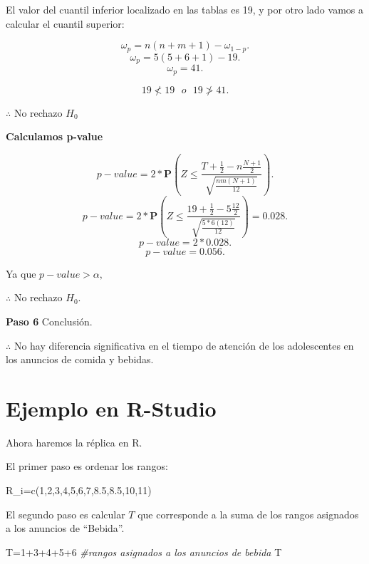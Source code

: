 \documentclass[
  a4paper,
  oneside,
  openany]{book}
\newenvironment{Shaded}{\begin{snugshade}}{\end{snugshade}}
\newcommand{\CommentTok}[1]{\textcolor[rgb]{0.56,0.35,0.01}{\textit{#1}}}
\newcommand{\DecValTok}[1]{\textcolor[rgb]{0.00,0.00,0.81}{#1}}
\newcommand{\FloatTok}[1]{\textcolor[rgb]{0.00,0.00,0.81}{#1}}
\newcommand{\FunctionTok}[1]{\textcolor[rgb]{0.00,0.00,0.00}{#1}}
\newcommand{\NormalTok}[1]{#1}
\newcommand{\OtherTok}[1]{\textcolor[rgb]{0.56,0.35,0.01}{#1}}
\newcommand{\SpecialCharTok}[1]{\textcolor[rgb]{0.00,0.00,0.00}{#1}}
\begin{document}
El valor del cuantil inferior localizado en las tablas es 19, y por otro lado vamos a calcular el cuantil superior:

\[\omega_p= n(n+m+1)-\omega_{1-p}.\]
\[\omega_p= 5(5+6+1)-19.\]
\[\omega_p= 41.\]

\[19 \nless   19  \ \ \  o \ \ \  19 \ngtr 41.\]

\(\therefore\) No rechazo \(H_0\)

\textbf{Calculamos p-value}

\[p-value = 2*\mathbf{P}\left(Z\leq\frac{T+\frac{1}{2}-n\frac{N+1}{2}}{\sqrt{\frac{nm(N+1)}{12}}}\right).\]
\[p-value = 2*\mathbf{P}\left(Z\leq\frac{19+\frac{1}{2}-5\frac{12}{2}}{\sqrt{\frac{5*6(12)}{12}}}\right)=0.028.\]
\[p-value = 2*0.028.\]
\[p-value = 0.056.\]

Ya que \(p-value > \alpha,\)

\(\therefore\) No rechazo \(H_0.\)

\textbf{Paso 6} Conclusión.

\(\therefore\) No hay diferencia significativa en el tiempo de atención de los adolescentes en los anuncios de comida y bebidas.

\hypertarget{ejemplo-en-r-studio-5}{%
\section{Ejemplo en R-Studio}\label{ejemplo-en-r-studio-5}}

Ahora haremos la réplica en R.

El primer paso es ordenar los rangos:

\begin{Shaded}
\begin{Highlighting}[]
\NormalTok{R\_i}\OtherTok{=}\FunctionTok{c}\NormalTok{(}\DecValTok{1}\NormalTok{,}\DecValTok{2}\NormalTok{,}\DecValTok{3}\NormalTok{,}\DecValTok{4}\NormalTok{,}\DecValTok{5}\NormalTok{,}\DecValTok{6}\NormalTok{,}\DecValTok{7}\NormalTok{,}\FloatTok{8.5}\NormalTok{,}\FloatTok{8.5}\NormalTok{,}\DecValTok{10}\NormalTok{,}\DecValTok{11}\NormalTok{)}
\end{Highlighting}
\end{Shaded}

El segundo paso es calcular \(T\) que corresponde a la suma de los rangos asignados a los anuncios de ``Bebida''.

\begin{Shaded}
\begin{Highlighting}[]
\NormalTok{T}\OtherTok{=}\DecValTok{1}\SpecialCharTok{+}\DecValTok{3}\SpecialCharTok{+}\DecValTok{4}\SpecialCharTok{+}\DecValTok{5}\SpecialCharTok{+}\DecValTok{6}  \CommentTok{\#rangos asignados a los anuncios de bebida}
\NormalTok{T}
\end{Highlighting}
\end{Shaded}
\end{document}
